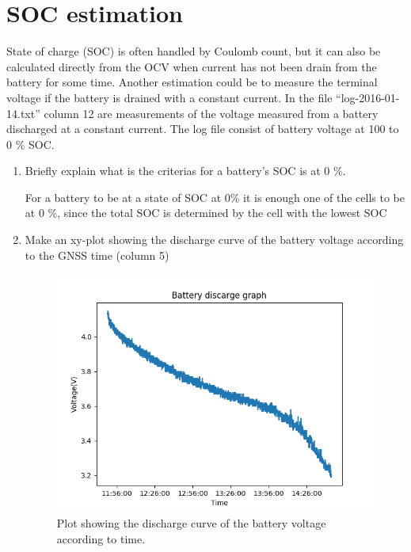 \documentclass[paper=letter, fontsize=10pt]{article}
\begin{document}
\section{SOC estimation}


State of charge (SOC) is often handled by Coulomb count, but it can also be calculated directly from the OCV when current has not been drain from the battery for some time. Another estimation could be to measure the terminal voltage if the battery is drained with a constant current. In the file “log-2016-01-14.txt” column 12 are measurements of the voltage measured from a battery discharged at a constant current. The log file consist of battery voltage at 100 to 0 \% SOC. 

\begin{enumerate}
\item Briefly explain what is the criterias for a battery's SOC is at 0 \%.

For a battery to be at a state of SOC at 0\% it is enough one of the cells to be at 0 \%, since the total SOC is determined by the cell with the lowest SOC \cite{master_thesis}

\item Make an xy-plot showing the discharge curve of the battery voltage according to the GNSS time (column 5)


\begin{figure}[H]
\centering
\includegraphics[scale=0.7]{Figures/batterydischarge}
\caption{Plot showing the discharge curve of the battery voltage according to time.}
\label{fig_battery}
\end{figure}


\end{enumerate}
\end{document}
